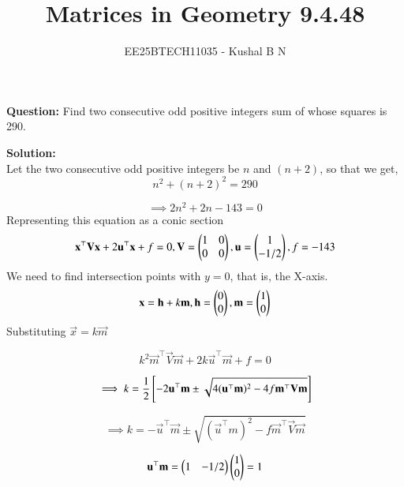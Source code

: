 \documentclass[journal,12pt,onecolumn]{IEEEtran}
\title{Matrices in Geometry 9.4.48}
\author{EE25BTECH11035 - Kushal B N}
\theoremstyle{remark}
\begin{document}
\vspace{3cm}
\maketitle
{\let\newpage\relax\maketitle}
\textbf{Question: }
Find two consecutive odd positive integers sum of whose squares is 290.

\textbf{Solution: }\\
Let the two consecutive odd positive integers be $n$ and $(n+2)$, so that we get,
\begin{equation}
    n^2 + (n+2)^2 = 290
\end{equation}

\begin{equation}
    \implies 2n^2 + 2n - 143 = 0
\end{equation}
Representing this equation as a conic section
\begin{equation}
    \mathbf{x}^{\top}\mathbf{V}\mathbf{x} + 2\mathbf{u}^{\top}\mathbf{x} + f = 0, \mathbf{V} = \begin{pmatrix}1&0\\0&0\end{pmatrix}, \mathbf{u} = \begin{pmatrix}1\\-1/2\end{pmatrix}, f = -143
\end{equation}
We need to find intersection points with $y = 0$, that is, the X-axis.
\begin{equation}
    \mathbf{x} = \mathbf{h} + k\mathbf{m}, \mathbf{h} = \begin{pmatrix}0\\0\end{pmatrix}, \mathbf{m} = \begin{pmatrix}1\\0\end{pmatrix}
\end{equation}
Substituting $\vec{x} = k\vec{m}$

\begin{equation}
    k^2\vec{m}^{\top}\vec{V}\vec{m} + 2k\vec{u}^{\top}\vec{m} + f = 0
\end{equation}

\begin{equation}
    \implies k = \frac{1}{2}{}\left[-2\mathbf{u}^{\top}\mathbf{m} \pm \sqrt{4(\mathbf{u}^{\top}\mathbf{m})^2 - 4f\mathbf{m}^{\top}\mathbf{V}\mathbf{m}}\right]
\end{equation}

\begin{equation}
    \implies k = -\vec{u}^{\top}\vec{m} \pm \sqrt{(\vec{u}^{\top}m)^2 - f\vec{m}^{\top}\vec{V}\vec{m}}
\end{equation}

\begin{equation}
    \mathbf{u}^{\top}\mathbf{m} = \begin{pmatrix}1 & -1/2\end{pmatrix}\begin{pmatrix}1\\0\end{pmatrix} = 1
\end{equation}
\end{document}
